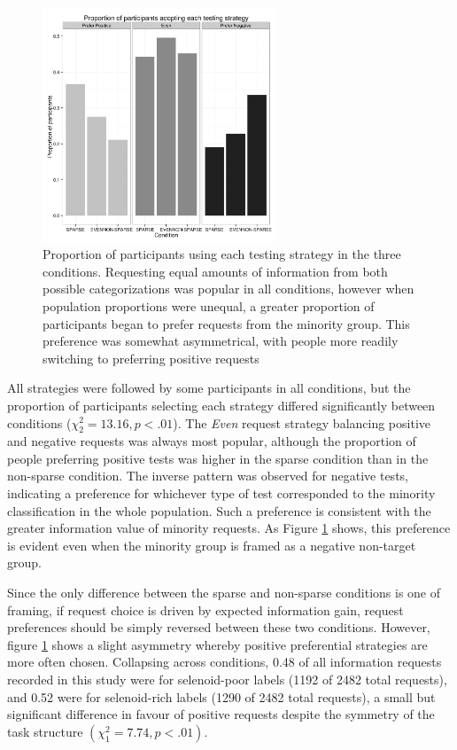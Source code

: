 \documentclass[10pt,letterpaper]{article}
\begin{document}
\begin{figure}[t]
\centering
\includegraphics[width=.5\textwidth,height=7cm,keepaspectratio]{sbsnew.png}
\caption{Proportion of participants using each testing strategy in the three conditions. Requesting equal amounts of information from both possible categorizations was popular in all conditions, however when population proportions were unequal, a greater proportion of participants began to prefer requests from the minority group. This preference was somewhat asymmetrical, with people more readily switching to preferring positive requests}
\label{sidebysidebar3}
\end{figure}

All strategies were followed by some participants in all conditions, but the proportion of participants selecting each strategy differed significantly between conditions ($\chi^2_2=13.16,p<.01$). %
The \textit{Even} request strategy balancing positive and negative requests was always most popular, although the proportion of people preferring positive tests was higher in the {\sc sparse} condition than in the {\sc non-sparse} condition. The inverse pattern was observed for negative tests, indicating a preference for whichever type of test corresponded to the minority classification in the whole population. Such a preference is consistent with the greater information value of minority requests. As Figure \ref{sidebysidebar3} shows, this preference is evident even when the minority group is framed as a negative non-target group.

Since the only difference between the {\sc sparse} and {\sc non-sparse} conditions is one of framing, if request choice is driven by expected information gain, request preferences should be simply reversed between these two conditions. However, figure \ref{sidebysidebar3} shows a slight asymmetry whereby positive preferential strategies are more often chosen. Collapsing across conditions, 0.48 of all information requests recorded in this study were for selenoid-poor labels (1192 of 2482 total requests), and 0.52 were for selenoid-rich labels (1290 of 2482 total requests), a small but significant difference in favour of positive requests despite the symmetry of the task structure $(\chi^2_1=7.74, p<.01)$. %
\end{document}
